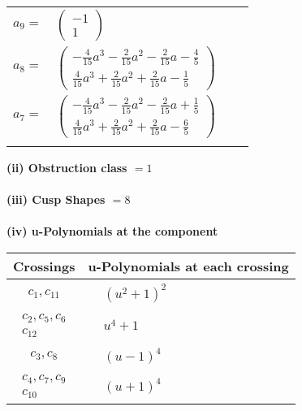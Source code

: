 \documentclass[1p]{elsarticle_modified}
\theoremstyle{definition}
\begin{document}
\begin{tabular}{m{7pt} m{180pt} m{7pt} m{180pt} }
\flushright $a_{9}=$&$\begin{pmatrix}-1\\1\end{pmatrix}$ \\
\flushright $a_{8}=$&$\begin{pmatrix}-\frac{4}{15} a^3-\frac{2}{15} a^2-\frac{2}{15} a-\frac{4}{5}\\\frac{4}{15} a^3+\frac{2}{15} a^2+\frac{2}{15} a-\frac{1}{5}\end{pmatrix}$ \\
\flushright $a_{7}=$&$\begin{pmatrix}-\frac{4}{15} a^3-\frac{2}{15} a^2-\frac{2}{15} a+\frac{1}{5}\\\frac{4}{15} a^3+\frac{2}{15} a^2+\frac{2}{15} a-\frac{6}{5}\end{pmatrix}$\\&\end{tabular}
\flushleft \textbf{(ii) Obstruction class $= 1$}\\~\\
\flushleft \textbf{(iii) Cusp Shapes $= 8$}\\~\\
\newpage\renewcommand{\arraystretch}{1}
\flushleft \textbf{(iv) u-Polynomials at the component}\newline \\
\begin{tabular}{m{50pt}|m{274pt}}
Crossings & \hspace{64pt}u-Polynomials at each crossing \\
\hline $$\begin{aligned}c_{1},c_{11}\end{aligned}$$&$\begin{aligned}
&(u^2+1)^2
\end{aligned}$\\
\hline $$\begin{aligned}c_{2},c_{5},c_{6}\\c_{12}\end{aligned}$$&$\begin{aligned}
&u^4+1
\end{aligned}$\\
\hline $$\begin{aligned}c_{3},c_{8}\end{aligned}$$&$\begin{aligned}
&(u-1)^4
\end{aligned}$\\
\hline $$\begin{aligned}c_{4},c_{7},c_{9}\\c_{10}\end{aligned}$$&$\begin{aligned}
&(u+1)^4
\end{aligned}$\\
\hline
\end{tabular}\\~\\
\end{document}
